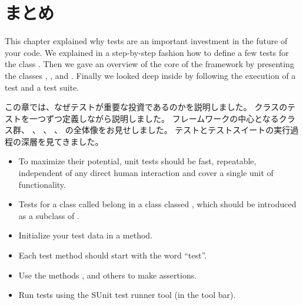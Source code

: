 \documentclass[a4paper,10pt,twoside]{book}
\begin{document}
{%



\section{まとめ}

This chapter explained why tests are an important investment in 
the future of your code.  
We explained in a step-by-step fashion how
to define a few tests for the class .
Then we gave an overview of the core of the \sunit framework by presenting
the classes , , 
and .  Finally we looked deep inside \sunit by
following the execution of a test and a test suite.
\fi

この章では、なぜテストが重要な投資であるのかを説明しました。
 クラスのテストを一つずつ定義しながら説明しました。
\sunit フレームワークの中心となるクラス群、  、  、  、  の全体像をお見せしました。
テストとテストスイートの実行過程の深層を見てきました。

\begin{itemize}
  \item To maximize their potential, unit tests should be fast, repeatable, independent of any direct human interaction and cover a single unit of functionality.
  \item Tests for a class called  belong in a class classed , which should be introduced as a subclass of .
  \item Initialize your test data in a  method.
  \item Each test method should start with the word ``test''.
  \item Use the  methods ,  and others to make assertions.
  \item Run tests using the SUnit test runner tool (in the tool bar).
\end{itemize}
\fi

}
\end{document}
